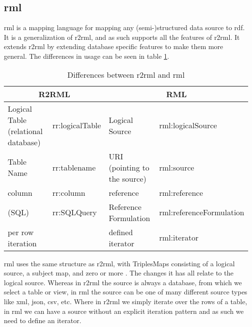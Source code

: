 \subsection{\acrshort{rml}}
\acrfull{rml} is a mapping language for mapping any (semi-)structured data source to \acrshort{rdf}. It is a generalization of \acrshort{r2rml}, and as such supports all the features of \acrshort{r2rml}. It extends \acrshort{r2rml} by extending database specific features to make them more general. The differences in usage can be seen in table \ref{tab:r2rml_rml_differences}. \citep{rml}

\begin{table}[]
    \begin{tabular}{|ll|ll|}
    \hline
    \multicolumn{2}{|c|}{R2RML}                           & \multicolumn{2}{c|}{RML}                                            \\ \hline
    Logical Table (relational database) & rr:logicalTable & Logical Source                           & rml:logicalSource        \\ \hline
    Table Name                          & rr:tablename    & URI (pointing to the source)             & rml:source               \\ \hline
    column                              & rr:column       & reference                                & rml:reference            \\ \hline
    (SQL)                               & rr:SQLQuery     & Reference Formulation                    & rml:referenceFormulation \\ \hline
    per row iteration                   &                 & defined iterator                         & rml:iterator             \\ \hline
    \end{tabular}
    \caption{Differences between \acrshort{r2rml} and \acrshort{rml}}
    \label{tab:r2rml_rml_differences}
\end{table}

\acrshort{rml} uses the same structure as \acrshort{r2rml}, with TriplesMaps consisting of a logical source, a subject map, and zero or more . The changes it has all relate to the logical source. Whereas in \acrshort{r2rml} the source is always a database, from which we select a table or view, in \acrshort{rml} the source can be one of many different source types like \acrshort{xml}, \acrshort{json}, \acrshort{csv}, etc. Where in \acrshort{r2rml} we simply iterate over the rows of a table, in \acrshort{rml} we can have a source without an explicit iteration pattern and as such we need to define an iterator. 

